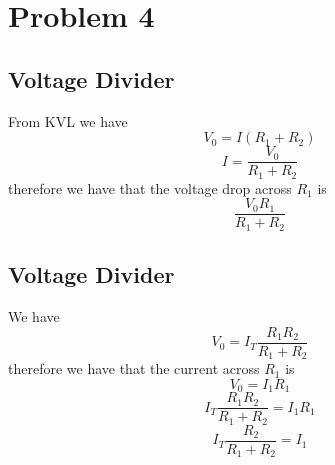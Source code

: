 \documentclass[12pt]{article}
\begin{document}
\section*{Problem 4}
\subsection*{Voltage Divider}
From KVL we have
$$V_0=I(R_1+R_2)$$
$$I=\frac{V_0}{R_1+R_2}$$
therefore we have that the voltage drop across $R_1$ is
$$\frac{V_0 R_1}{R_1+R_2}$$
\subsection*{Voltage Divider}
We have
$$V_0=I_T\frac{R_1R_2}{R_1+R_2}$$
therefore we have that the current across $R_1$ is
$$V_0=I_1 R_1$$
$$I_T\frac{R_1R_2}{R_1+R_2}=I_1R_1$$
$$I_T\frac{R_2}{R_1+R_2}=I_1$$
\end{document}
